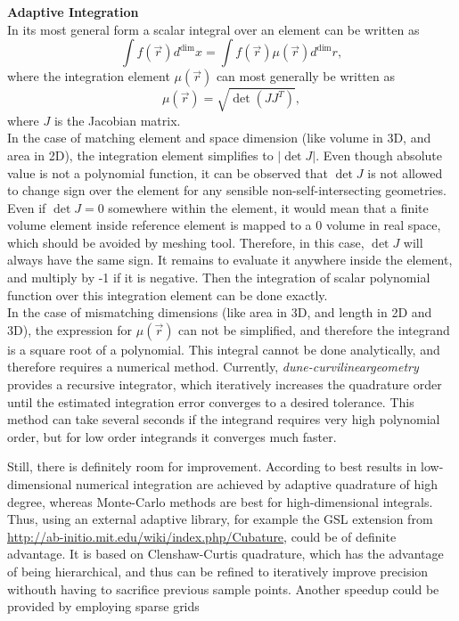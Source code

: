 \noindent
\textbf{Adaptive Integration}\\
In its most general form a scalar integral over an element can be written as \[\int f(\vec{r}) d^{\dim} x = \int f(\vec{r}) \mu(\vec{r}) d^{\dim} r,\] where the integration element $\mu(\vec{r})$ can most generally be written as \[\mu(\vec{r}) = \sqrt{\det(J J^T)},\] where $J$ is the Jacobian matrix. \\

\noindent
In the case of matching element and space dimension (like volume in 3D, and area in 2D), the integration element simplifies to $|\det J|$. Even though absolute value is not a polynomial function, it can be observed that $\det J$ is not allowed to change sign over the element for any sensible non-self-intersecting geometries. Even if $\det J = 0$ somewhere within the element, it would mean that a finite volume element inside reference element is mapped to a 0 volume in real space, which should be avoided by meshing tool. Therefore, in this case, $\det J$ will always have the same sign. It remains to evaluate it anywhere inside the element, and multiply by -1 if it is negative. Then the integration of scalar polynomial function over this integration element can be done exactly. \\

\noindent
In the case of mismatching dimensions (like area in 3D, and length in 2D and 3D), the expression for $\mu(\vec{r})$ can not be simplified, and therefore the integrand is a square root of a polynomial. This integral cannot be done analytically, and therefore requires a numerical method. Currently, \textit{dune-curvilineargeometry} provides a recursive integrator, which iteratively increases the quadrature order until the estimated integration error converges to a desired tolerance. This method can take several seconds if the integrand requires very high polynomial order, but for low order integrands it converges much faster.

\noindent
Still, there is definitely room for improvement. According to \cite{schurer2003} best results in low-dimensional numerical integration are achieved by adaptive quadrature of high degree, whereas Monte-Carlo methods are best for high-dimensional integrals. Thus, using an external adaptive library, for example the GSL extension from \url{http://ab-initio.mit.edu/wiki/index.php/Cubature}, could be of definite advantage. It is based on Clenshaw-Curtis quadrature, which has the advantage of being hierarchical, and thus can be refined to iteratively improve precision withouth having to sacrifice previous sample points. Another speedup could be provided by employing sparse grids \cite{petras2000} \\

